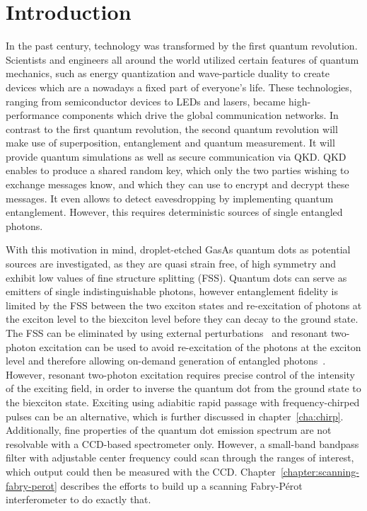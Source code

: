 \chapter{Introduction}

In the past century, technology was transformed by the first quantum revolution. Scientists and engineers all around the world utilized certain features of quantum mechanics, such as energy quantization and wave-particle duality to create devices which are a nowadays a fixed part of everyone's life.
These technologies, ranging from semiconductor devices to LEDs and lasers, became high-performance components which drive the global communication networks.
In contrast to the first quantum revolution, the second quantum revolution will make use of superposition, entanglement and quantum measurement.
It will provide quantum simulations as well as secure communication via \ac{QKD}.
\ac{QKD} enables to produce a shared random key, which only the two parties wishing to exchange messages know, and which they can use to encrypt and decrypt these messages.
It even allows to detect eavesdropping by implementing quantum entanglement.
However, this requires deterministic sources of single entangled photons.

With this motivation in mind, droplet-etched GasAs quantum dots as potential sources are investigated, as they are quasi strain free, of high symmetry and exhibit low values of fine structure splitting (\acs{FSS}).
Quantum dots can serve as emitters of single indistinguishable photons, however entanglement fidelity is limited by the \acs{FSS} between the two exciton states \cite{bayer_fine_2002} and re-excitation of photons at the exciton level to the biexciton level before they can decay to the ground state.
The FSS can be eliminated by using external perturbations~\cite{plumhof_experimental_2012} and resonant two-photon excitation can be used to avoid re-excitation of the photons at the exciton level and therefore allowing on-demand generation of entangled photons~\cite{jayakumar_deterministic_2013}.
However, resonant two-photon excitation requires precise control of the intensity of the exciting field, in order to inverse the quantum dot from the ground state to the biexciton state.
Exciting using adiabitic rapid passage with frequency-chirped pulses can be an alternative, which is further discussed in chapter~\ref{cha:chirp}.
Additionally, fine properties of the quantum dot emission spectrum are not resolvable with a CCD-based spectrometer only.
However, a small-band bandpass filter with adjustable center frequency could scan through the ranges of interest, which output could then be measured with the CCD.
Chapter~\ref{chapter:scanning-fabry-perot} describes the efforts to build up a scanning Fabry-Pérot interferometer to do exactly that.



